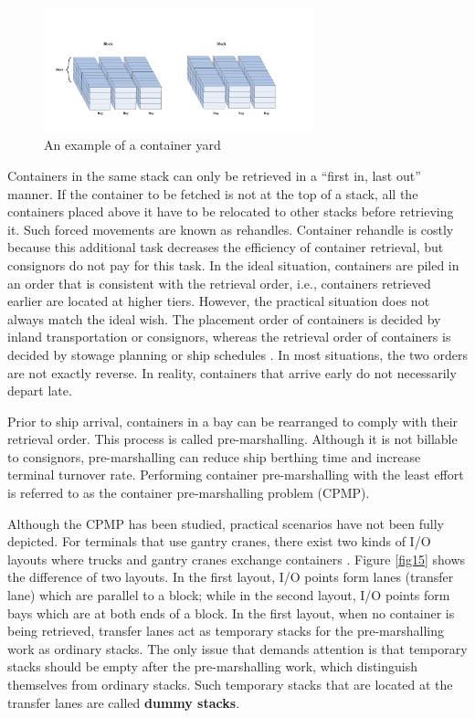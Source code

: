 \documentclass[review,3p,times,authoryear,12pt]{elsarticle}
\begin{document}
\begin{figure}[!htb]
\centering
\includegraphics[width=0.7\textwidth]{fig1.pdf}
\caption{An example of a container yard}
\label{fig:1}
\end{figure}

Containers in the same stack can only be retrieved in a ``first in, last out'' manner.
If the container to be fetched is not at the top of a stack, all the containers placed above it have to be relocated to other stacks before retrieving it.
Such forced movements are known as rehandles.
Container rehandle is costly because this additional task decreases the efficiency of container retrieval, but consignors do not pay for this task.
In the ideal situation, containers are piled in an order that is consistent with the retrieval order, i.e., containers retrieved earlier are located at higher tiers.
However, the practical situation does not always match the ideal wish.
The placement order of containers is decided by inland transportation or consignors, whereas the retrieval order of containers is decided by stowage planning or ship schedules \citep{Kanet1986}.
In most situations, the two orders are not exactly reverse. In reality, containers that arrive early do not necessarily depart late.

Prior to ship arrival, containers in a bay can be rearranged to comply with their retrieval order.
This process is called pre-marshalling.
Although it is not billable to consignors, pre-marshalling can reduce ship berthing time and increase terminal turnover rate.
Performing container pre-marshalling with the least effort is referred to as the container pre-marshalling problem (CPMP).

Although the CPMP has been studied, practical scenarios have not been fully depicted.
For terminals that use gantry cranes, there exist two kinds of I/O layouts where trucks and gantry cranes exchange containers \citep{Carlo2014}.
Figure \ref{fig15} shows the difference of two layouts.
In the first layout, I/O points form lanes (transfer lane) which are parallel to a block; while in the second layout, I/O points form bays which are at both ends of a block.
In the first layout, when no container is being retrieved, transfer lanes act as temporary stacks for the pre-marshalling work as ordinary stacks.
The only issue that demands attention is that temporary stacks should be empty after the pre-marshalling work, which distinguish themselves from ordinary stacks.
Such temporary stacks that are located at the transfer lanes are called \textbf{dummy stacks}.
\end{document}
